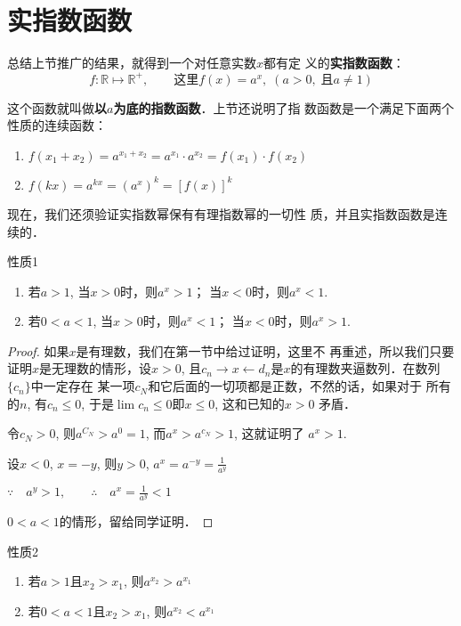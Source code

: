 \section{实指数函数}
总结上节推广的结果，就得到一个对任意实数$x$都有定
义的\textbf{实指数函数}：
\[f:\mathbb{R}\mapsto \mathbb{R}^+,\qquad \text{这里} f(x)=a^x,\; (a>0, \; \text{且}a\ne 1)\]

这个函数就叫做\textbf{以$a$为底的指数函数}．上节还说明了指
数函数是一个满足下面两个性质的连续函数：
\begin{enumerate}
  \item $f(x_1+x_2)=a^{x_1+x_2}=a^{x_1}\cdot a^{x_2}=f(x_1)\cdot f(x_2)$
  \item $f(kx)=a^{kx}=(a^x)^k=[f(x)]^k$
\end{enumerate}

现在，我们还须验证实指数幂保有有理指数幂的一切性
质，并且实指数函数是连续的．

\begin{blk}{性质1}
\begin{enumerate}
  \item 若$a>1$, 当$x>0$时，则$a^x>1$；
当$x<0$时，则$a^x<1$.
\item 若$0<a<1$, 当$x>0$时，则$a^x<1$； 
当$x<0$时，则$a^x>1$.
\end{enumerate}
\end{blk}

\begin{proof}
  如果$x$是有理数，我们在第一节中给过证明，这里不
再重述，所以我们只要证明$x$是无理数的情形，设$x>0$,
且$c_n\to x\leftarrow d_n$是$x$的有理数夹逼数列．在数列$\{c_n\}$中一定存在
某一项$c_N$和它后面的一切项都是正数，不然的话，如果对于
所有的$n$, 有$c_n\le 0$, 于是$\lim c_n\le 0$即$x\le 0$, 这和已知的$x>0$
矛盾．

令$c_N>0$, 则$a^{C_N}>a^0=1$, 而$a^x>a^{c_N}>1$, 这就证明了
$a^x>1$.

设$x<0$, $x=-y$, 则$y>0$, $a^x=a^{-y}=\frac{1}{a^y}$

$\because\quad a^y>1,\qquad \therefore\quad a^x=\frac{1}{a^y}<1$

$0<a<1$的情形，留给同学证明．
\end{proof}

\begin{blk}{性质2}
\begin{enumerate}
  \item 若$a>1$且$x_2>x_1$, 则$a^{x_2}>a^{x_1}$
  \item 若$0<a<1$且$x_2>x_1$, 则$a^{x_2}<a^{x_1}$
\end{enumerate}
\end{blk}

